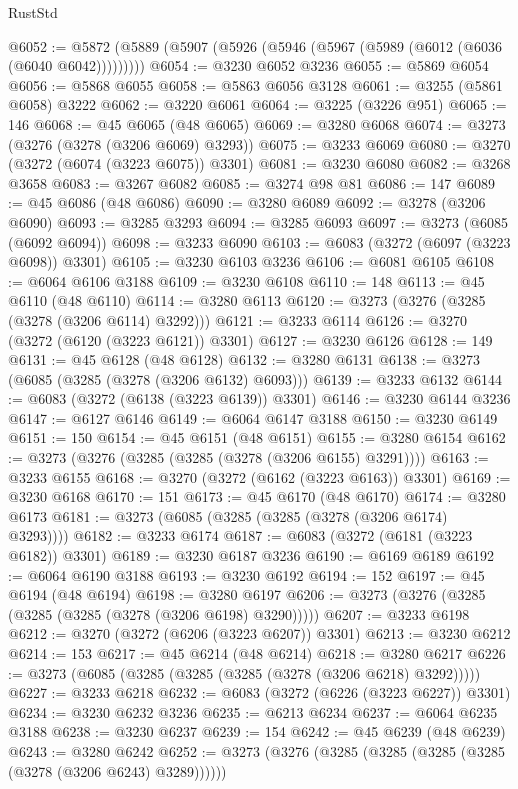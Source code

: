 \begin{lexlean}{RustStd}
\begin{coremodule}
{\begin{coremodule}
{{{{{{{{{{{{{{{{{{{{{{{{{{{{{{{{{{{{{@6052 := @5872 (@5889 (@5907 (@5926 (@5946 (@5967 (@5989 (@6012 (@6036 (@6040 @6042)))))))))
@6054 := @3230 @6052 @3236
@6055 := @5869 @6054
@6056 := @5868 @6055
@6058 := @5863 @6056 @3128
@6061 := @3255 (@5861 @6058) @3222
@6062 := @3220 @6061
@6064 := @3225 (@3226 @951)
@6065 := 146
@6068 := @45 @6065 (@48 @6065)
@6069 := @3280 @6068
@6074 := @3273 (@3276 (@3278 (@3206 @6069) @3293))
@6075 := @3233 @6069
@6080 := @3270 (@3272 (@6074 (@3223 @6075)) @3301)
@6081 := @3230 @6080
@6082 := @3268 @3658
@6083 := @3267 @6082
@6085 := @3274 @98 @81
@6086 := 147
@6089 := @45 @6086 (@48 @6086)
@6090 := @3280 @6089
@6092 := @3278 (@3206 @6090)
@6093 := @3285 @3293
@6094 := @3285 @6093
@6097 := @3273 (@6085 (@6092 @6094))
@6098 := @3233 @6090
@6103 := @6083 (@3272 (@6097 (@3223 @6098)) @3301)
@6105 := @3230 @6103 @3236
@6106 := @6081 @6105
@6108 := @6064 @6106 @3188
@6109 := @3230 @6108
@6110 := 148
@6113 := @45 @6110 (@48 @6110)
@6114 := @3280 @6113
@6120 := @3273 (@3276 (@3285 (@3278 (@3206 @6114) @3292)))
@6121 := @3233 @6114
@6126 := @3270 (@3272 (@6120 (@3223 @6121)) @3301)
@6127 := @3230 @6126
@6128 := 149
@6131 := @45 @6128 (@48 @6128)
@6132 := @3280 @6131
@6138 := @3273 (@6085 (@3285 (@3278 (@3206 @6132) @6093)))
@6139 := @3233 @6132
@6144 := @6083 (@3272 (@6138 (@3223 @6139)) @3301)
@6146 := @3230 @6144 @3236
@6147 := @6127 @6146
@6149 := @6064 @6147 @3188
@6150 := @3230 @6149
@6151 := 150
@6154 := @45 @6151 (@48 @6151)
@6155 := @3280 @6154
@6162 := @3273 (@3276 (@3285 (@3285 (@3278 (@3206 @6155) @3291))))
@6163 := @3233 @6155
@6168 := @3270 (@3272 (@6162 (@3223 @6163)) @3301)
@6169 := @3230 @6168
@6170 := 151
@6173 := @45 @6170 (@48 @6170)
@6174 := @3280 @6173
@6181 := @3273 (@6085 (@3285 (@3285 (@3278 (@3206 @6174) @3293))))
@6182 := @3233 @6174
@6187 := @6083 (@3272 (@6181 (@3223 @6182)) @3301)
@6189 := @3230 @6187 @3236
@6190 := @6169 @6189
@6192 := @6064 @6190 @3188
@6193 := @3230 @6192
@6194 := 152
@6197 := @45 @6194 (@48 @6194)
@6198 := @3280 @6197
@6206 := @3273 (@3276 (@3285 (@3285 (@3285 (@3278 (@3206 @6198) @3290)))))
@6207 := @3233 @6198
@6212 := @3270 (@3272 (@6206 (@3223 @6207)) @3301)
@6213 := @3230 @6212
@6214 := 153
@6217 := @45 @6214 (@48 @6214)
@6218 := @3280 @6217
@6226 := @3273 (@6085 (@3285 (@3285 (@3285 (@3278 (@3206 @6218) @3292)))))
@6227 := @3233 @6218
@6232 := @6083 (@3272 (@6226 (@3223 @6227)) @3301)
@6234 := @3230 @6232 @3236
@6235 := @6213 @6234
@6237 := @6064 @6235 @3188
@6238 := @3230 @6237
@6239 := 154
@6242 := @45 @6239 (@48 @6239)
@6243 := @3280 @6242
@6252 := @3273 (@3276 (@3285 (@3285 (@3285 (@3285 (@3278 (@3206 @6243) @3289))))))
}}}}}}}}}}}}}}}}}}}}}}}}}}}}}}}}}}}}}
\end{coremodule}}
\end{coremodule}
\end{lexlean}
